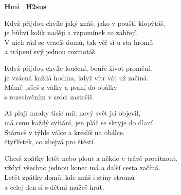 
\re{}
{\footnotesize \textbf{Hmi \ H2sus}}

\ve{}
Když přijdou chvíle jaký znáš, jako v poušti klopýtáš,\\
je bůhví kolik nadějí a vzpomínek co zahřejí. \\
V nich rád se vracíš domů, tak věř si u sta hromů\\
a trápení svý jednou rozmotáš.

\ve{}
Když přijdou chvíle loučení, bouře život promění,\\
je vzácná každá hodina, když vítr vát už začíná.\\
Mámě píšeš z války a psaní do obálky\\
s rozechvěním v srdci zastrčíš.

\ve{}
Ať plují mraky tisíc mil, nový svět jsi objevil,\\
má cenu každý svítání, jen pláč se skryje do dlaní.\\
Stárneš v týhle válce a kreslíš na obálce,\\
čtyřlístek, co zbejvá pro štěstí.

\ve{}
Chceš zpátky letět nebo plout a někde v trávě procitnout,\\
vždyť všechno jednou konec má a další cesta začíná.\\
Letět zpátky domů, kde znáš i stíny stromů\\
a celej den si s dětmi můžeš hrát. 

\esong{}